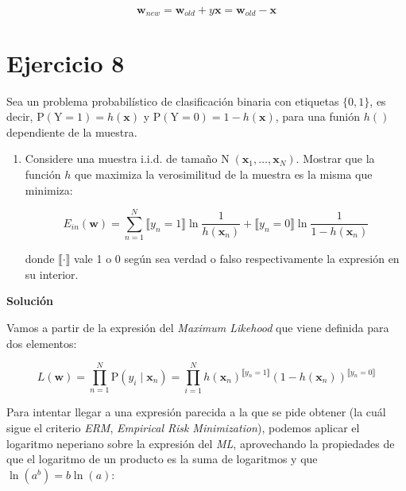 \documentclass[11pt,a4paper]{article}
\newcommand{\answer}{\noindent\textbf{Solución}}
\begin{document}
\begin{equation}
	\mathbf{w}_{new} = \mathbf{w}_{old} + y\mathbf{x} = \mathbf{w}_{old} - \mathbf{x}
\end{equation}

\section*{Ejercicio 8}

\noindent Sea un problema probabilístico de clasificación binaria con etiquetas $\lbrace 0, 1\rbrace$, es decir,
$\text{P} (\text{Y} = 1) = h(\mathbf{x})$ y $\text{P} (\text{Y} = 0) = 1 - h(\mathbf{x})$, para una funión $h()$ dependiente
de la muestra.

\begin{enumerate}[label=\textit{\alph*})]
	\item Considere una muestra i.i.d. de tamaño $\text{N}\;(\mathbf{x}_1, \dots, \mathbf{x}_N)$. Mostrar que la función
	$h$ que maximiza la verosimilitud de la muestra es la misma que minimiza:
	
	\[E_{in}(\mathbf{w}) = \sum_{n=1}^N  \llbracket y_n = 1 \rrbracket \ln \frac{1}{h(\mathbf{x}_n)} +
	\llbracket y_n = 0 \rrbracket \ln \frac{1}{1 - h(\mathbf{x}_n)} \]
	
	donde $\llbracket \cdot \rrbracket$ vale 1 o 0 según sea verdad o falso respectivamente la expresión en su interior.
\end{enumerate}

\answer

Vamos a partir de la expresión del \textit{Maximum Likehood} que viene definida para dos elementos:

\begin{equation}
	L(\mathbf{w}) = \prod_{n=1}^N \text{P}(y_i \;| \;\mathbf{x}_n) = \prod_{i=1}^N
	h(\mathbf{x}_n)^{\llbracket y_n = 1 \rrbracket} (1 - h(\mathbf{x}_n))^{\llbracket y_n = 0 \rrbracket}
\end{equation}

Para intentar llegar a una expresión parecida a la que se pide obtener (la cuál sigue el criterio \textit{ERM},
\textit{Empirical Risk Minimization}), podemos aplicar el logaritmo neperiano sobre la expresión del \textit{ML},
aprovechando la propiedades de que el logaritmo de un producto es la suma de logaritmos y que $\ln(a^b) = b \ln(a)$:
\end{document}
